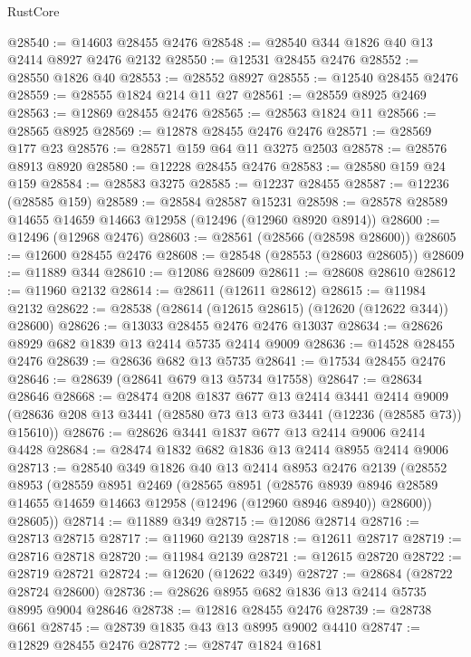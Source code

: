 \begin{lexlean}{RustCore}
\begin{coremodule}
@28540 := @14603 @28455 @2476
@28548 := @28540 @344 @1826 @40 @13 @2414 @8927 @2476 @2132
@28550 := @12531 @28455 @2476
@28552 := @28550 @1826 @40
@28553 := @28552 @8927
@28555 := @12540 @28455 @2476
@28559 := @28555 @1824 @214 @11 @27
@28561 := @28559 @8925 @2469
@28563 := @12869 @28455 @2476
@28565 := @28563 @1824 @11
@28566 := @28565 @8925
@28569 := @12878 @28455 @2476 @2476
@28571 := @28569 @177 @23
@28576 := @28571 @159 @64 @11 @3275 @2503
@28578 := @28576 @8913 @8920
@28580 := @12228 @28455 @2476
@28583 := @28580 @159 @24 @159
@28584 := @28583 @3275
@28585 := @12237 @28455
@28587 := @12236 (@28585 @159)
@28589 := @28584 @28587 @15231
@28598 := @28578 @28589 @14655 @14659 @14663 @12958 (@12496 (@12960 @8920 @8914))
@28600 := @12496 (@12968 @2476)
@28603 := @28561 (@28566 (@28598 @28600))
@28605 := @12600 @28455 @2476
@28608 := @28548 (@28553 (@28603 @28605))
@28609 := @11889 @344
@28610 := @12086 @28609
@28611 := @28608 @28610
@28612 := @11960 @2132
@28614 := @28611 (@12611 @28612)
@28615 := @11984 @2132
@28622 := @28538 (@28614 (@12615 @28615) (@12620 (@12622 @344)) @28600)
@28626 := @13033 @28455 @2476 @2476 @13037
@28634 := @28626 @8929 @682 @1839 @13 @2414 @5735 @2414 @9009
@28636 := @14528 @28455 @2476
@28639 := @28636 @682 @13 @5735
@28641 := @17534 @28455 @2476
@28646 := @28639 (@28641 @679 @13 @5734 @17558)
@28647 := @28634 @28646
@28668 := @28474
    @208
    @1837
    @677
    @13
    @2414
    @3441
    @2414
    @9009
    (@28636 @208 @13 @3441 (@28580 @73 @13 @73 @3441 (@12236 (@28585 @73)) @15610))
@28676 := @28626 @3441 @1837 @677 @13 @2414 @9006 @2414 @4428
@28684 := @28474 @1832 @682 @1836 @13 @2414 @8955 @2414 @9006
@28713 := @28540
    @349
    @1826
    @40
    @13
    @2414
    @8953
    @2476
    @2139
    (@28552
      @8953
      (@28559
        @8951
        @2469
        (@28565
          @8951
          (@28576
            @8939
            @8946
            @28589
            @14655
            @14659
            @14663
            @12958
            (@12496 (@12960 @8946 @8940))
            @28600))
        @28605))
@28714 := @11889 @349
@28715 := @12086 @28714
@28716 := @28713 @28715
@28717 := @11960 @2139
@28718 := @12611 @28717
@28719 := @28716 @28718
@28720 := @11984 @2139
@28721 := @12615 @28720
@28722 := @28719 @28721
@28724 := @12620 (@12622 @349)
@28727 := @28684 (@28722 @28724 @28600)
@28736 := @28626 @8955 @682 @1836 @13 @2414 @5735 @8995 @9004 @28646
@28738 := @12816 @28455 @2476
@28739 := @28738 @661
@28745 := @28739 @1835 @43 @13 @8995 @9002 @4410
@28747 := @12829 @28455 @2476
@28772 := @28747
    @1824
    @1681

\end{coremodule}
\end{lexlean}
